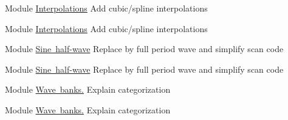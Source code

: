 
\begin{DoxyRefList}
\item[Module \mbox{\hyperlink{group__utils__float__math_amgrp4f6557801e0d72940d342939119826d0}{Interpolations}} ]\label{todo__todo000003}%
%
Add cubic/spline interpolations


\item[Module \mbox{\hyperlink{group__utils__float__math_amgrp4f6557801e0d72940d342939119826d0}{Interpolations}} ]\label{todo__todo000003}%
%
Add cubic/spline interpolations


\item[Module \mbox{\hyperlink{group__fx_amgrp5c23d81a9378c4ff2e4abd3f6a8099c4}{Sine half-\/wave}} ]\label{todo__todo000001}%
%
Replace by full period wave and simplify scan code


\item[Module \mbox{\hyperlink{group__fx_amgrp5c23d81a9378c4ff2e4abd3f6a8099c4}{Sine half-\/wave}} ]\label{todo__todo000001}%
%
Replace by full period wave and simplify scan code


\item[Module \mbox{\hyperlink{group__osc__api_amgrp4774bb87612135e5656df9287e489562}{Wave banks.}} ]\label{todo__todo000002}%
%
Explain categorization 
\item[Module \mbox{\hyperlink{group__osc__api_amgrp4774bb87612135e5656df9287e489562}{Wave banks.}} ]\label{todo__todo000002}%
%
Explain categorization
\end{DoxyRefList}